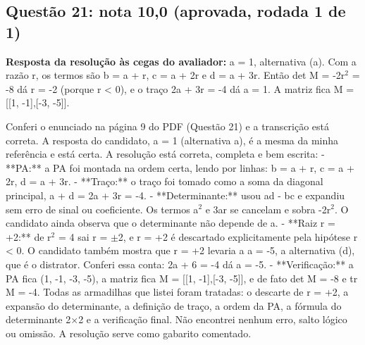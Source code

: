 \documentclass{article}%
\begin{document}
\subsection*{Questão 21: nota 10,0 (aprovada, rodada 1 de 1)}%
\textbf{Resposta da resolução às cegas do avaliador:} a = 1, alternativa (a). Com a razão r, os termos são b = a + r, c = a + 2r e d = a + 3r. Então det M = -2r$^2$ = -8 dá r = -2 (porque r < 0), e o traço 2a + 3r = -4 dá a = 1. A matriz fica M = {[}{[}1, -1{]},{[}-3, -5{]}{]}.\par %
Conferi o enunciado na página 9 do PDF (Questão 21) e a transcrição está correta. A resposta do candidato, a = 1 (alternativa a), é a mesma da minha referência e está certa.\newline%
\newline%
A resolução está correta, completa e bem escrita:\newline%
{-} **PA:** a PA foi montada na ordem certa, lendo por linhas: b = a + r, c = a + 2r, d = a + 3r.\newline%
{-} **Traço:** o traço foi tomado como a soma da diagonal principal, a + d = 2a + 3r = -4.\newline%
{-} **Determinante:** usou ad - bc e expandiu sem erro de sinal ou coeficiente. Os termos a$^2$ e 3ar se cancelam e sobra -2r$^2$. O candidato ainda observa que o determinante não depende de a.\newline%
{-} **Raiz r = +2:** de r$^2$ = 4 sai r = $\pm$2, e r = +2 é descartado explicitamente pela hipótese r < 0. O candidato também mostra que r = +2 levaria a a = -5, a alternativa (d), que é o distrator. Conferi essa conta: 2a + 6 = -4 dá a = -5.\newline%
{-} **Verificação:** a PA fica (1, -1, -3, -5), a matriz fica M = {[}{[}1, -1{]},{[}-3, -5{]}{]}, e de fato det M = -8 e tr M = -4.\newline%
\newline%
Todas as armadilhas que listei foram tratadas: o descarte de r = +2, a expansão do determinante, a definição de traço, a ordem da PA, a fórmula do determinante 2$\times$2 e a verificação final. Não encontrei nenhum erro, salto lógico ou omissão. A resolução serve como gabarito comentado.%
\end{document}

